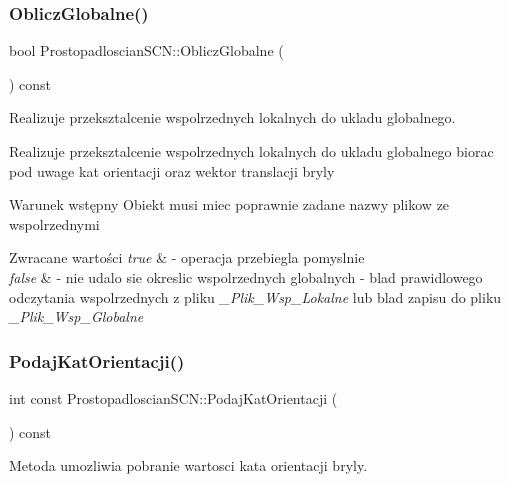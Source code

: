 \subsubsection{\texorpdfstring{Oblicz\+Globalne()}{ObliczGlobalne()}}
{\footnotesize\ttfamily bool Prostopadloscian\+S\+C\+N\+::\+Oblicz\+Globalne (\begin{DoxyParamCaption}{ }\end{DoxyParamCaption}) const}



Realizuje przeksztalcenie wspolrzednych lokalnych do ukladu globalnego. 

Realizuje przeksztalcenie wspolrzednych lokalnych do ukladu globalnego biorac pod uwage kat orientacji oraz wektor translacji bryly

\begin{DoxyPrecond}{Warunek wstępny}
Obiekt musi miec poprawnie zadane nazwy plikow ze wspolrzednymi 
\end{DoxyPrecond}

\begin{DoxyRetVals}{Zwracane wartości}
{\em true} & -\/ operacja przebiegla pomyslnie \\
\hline
{\em false} & -\/ nie udalo sie okreslic wspolrzednych globalnych -\/ blad prawidlowego odczytania wspolrzednych z pliku {\itshape \+\_\+\+Plik\+\_\+\+Wsp\+\_\+\+Lokalne} lub blad zapisu do pliku {\itshape \+\_\+\+Plik\+\_\+\+Wsp\+\_\+\+Globalne} \\
\hline
\end{DoxyRetVals}
\mbox{\label{classProstopadloscianSCN_a4d1aaf928130a4d48a0cdc9ab79917be}} 
\subsubsection{\texorpdfstring{Podaj\+Kat\+Orientacji()}{PodajKatOrientacji()}}
{\footnotesize\ttfamily int const Prostopadloscian\+S\+C\+N\+::\+Podaj\+Kat\+Orientacji (\begin{DoxyParamCaption}{ }\end{DoxyParamCaption}) const\hspace{0.3cm}{\ttfamily [inline]}}



Metoda umozliwia pobranie wartosci kata orientacji bryly. 

